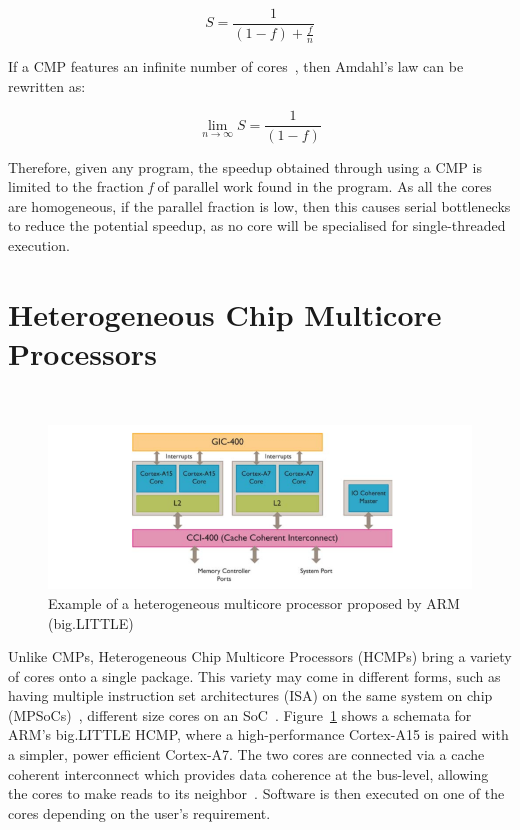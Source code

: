 \begin{equation}
S = \frac{1}{(1-f) + \frac{f}{n}}
\end{equation}\label{amdlaw}

If a CMP features an infinite number of cores~\cite{eyerman2010amdahl}, then Amdahl's law can be rewritten as:

\begin{equation}
\lim_{n\to\infty} S = \frac{1}{(1-f)}
\end{equation}

Therefore, given any program, the speedup obtained through using a CMP is limited to the fraction \textit{f} of parallel work found in the program.
As all the cores are homogeneous, if the parallel fraction is low, then this causes serial bottlenecks to reduce the potential speedup, as no core will be specialised for single-threaded execution.
\section{Heterogeneous Chip Multicore Processors}~\label{sec:hcmp}

\begin{figure}[t]
 \center
 \includegraphics[width=1\textwidth]{background/graphics/biglittle.png}
 \caption{Example of a heterogeneous multicore processor proposed by ARM (big.LITTLE)~\cite{armbig}}\label{fig:blarm}
\end{figure}
\vspace{-1em}

Unlike CMPs, Heterogeneous Chip Multicore Processors (HCMPs) bring a variety of cores onto a single package.
This variety may come in different forms, such as having multiple instruction set architectures (ISA) on the same system on chip (MPSoCs)~\cite{venkat2014harnessingisa,venkatHipstr2016}, different size cores on an SoC~\cite{armbig,jeff2012big}.
Figure~\ref{fig:blarm} shows a schemata for ARM's big.LITTLE HCMP, where a high-performance Cortex-A15 is paired with a simpler, power efficient Cortex-A7.
The two cores are connected via a cache coherent interconnect which provides data coherence at the bus-level, allowing the cores to make reads to its neighbor~\cite{armbig}.
Software is then executed on one of the cores depending on the user's requirement.

